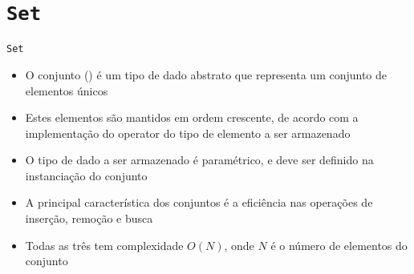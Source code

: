 \section{\texttt{Set}}

\begin{frame}[fragile]{\texttt{Set}}

    \begin{itemize}
        \item O conjunto () é um tipo de dado abstrato que representa um conjunto
            de elementos únicos

        \item Estes elementos são mantidos em ordem crescente, de acordo com a implementação
            do operator  do tipo de elemento a ser armazenado

        \item O tipo de dado a ser armazenado é paramétrico, e deve ser definido na instanciação
            do conjunto

        \item A principal característica dos conjuntos é a eficiência nas operações de inserção,
            remoção e busca

        \item Todas as três tem complexidade $O(N)$, onde $N$ é o número de elementos do conjunto
    \end{itemize}

\end{frame}

